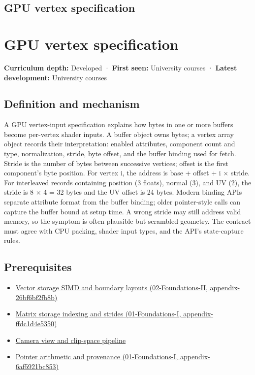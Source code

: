 \hypertarget{appendix-749ba51a6c25}{}
\section*{GPU vertex specification}
\chapter{GPU vertex specification}\label{appendix-749ba51a6c25-gpu-vertex-specification}

\textbf{Curriculum depth:} Developed · \textbf{First seen:} University courses · \textbf{Latest development:} University courses

\section{Definition and mechanism}\label{appendix-749ba51a6c25-definition-and-mechanism}

A GPU vertex-input specification explains how bytes in one or more buffers become per-vertex shader inputs. A buffer object owns bytes; a vertex array object records their interpretation: enabled attributes, component count and type, normalization, stride, byte offset, and the buffer binding used for fetch. Stride is the number of bytes between successive vertices; offset is the first component's byte position. For vertex i, the address is base + offset + i × stride. For interleaved records containing position (3 floats), normal (3), and UV (2), the stride is 8 × 4 = 32 bytes and the UV offset is 24 bytes. Modern binding APIs separate attribute format from the buffer binding; older pointer-style calls can capture the buffer bound at setup time. A wrong stride may still address valid memory, so the symptom is often plausible but scrambled geometry. The contract must agree with CPU packing, shader input types, and the API's state-capture rules.

\section{Prerequisites}\label{appendix-749ba51a6c25-prerequisites}

\begin{itemize}
\tightlist
\item
  \href{../02-Foundations-II/main.pdf\#nameddest=appendix-26bf6bf2fb8b}{Vector storage SIMD and boundary layouts (02-Foundations-II, appendix-26bf6bf2fb8b)}
\item
  \href{../01-Foundations-I/main.pdf\#nameddest=appendix-ffdc1d4e5350}{Matrix storage indexing and strides (01-Foundations-I, appendix-ffdc1d4e5350)}
\item
  \hyperref[appendix-1c07d64f5e70]{Camera view and clip-space pipeline}
\item
  \href{../01-Foundations-I/main.pdf\#nameddest=appendix-6af5921bc853}{Pointer arithmetic and provenance (01-Foundations-I, appendix-6af5921bc853)}
\end{itemize}


